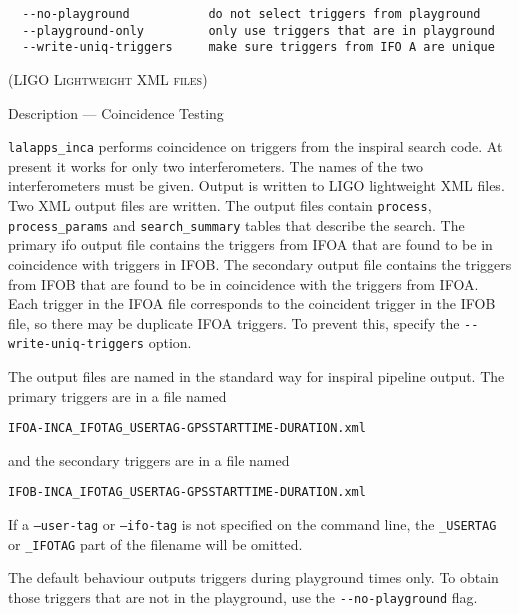 \begin{entry}
\begin{verbatim}
  --no-playground           do not select triggers from playground
  --playground-only         only use triggers that are in playground
  --write-uniq-triggers     make sure triggers from IFO A are unique

\end{verbatim}

\textsc{(LIGO Lightweight XML files)}

\item[Description --- Coincidence Testing] 

\verb$lalapps_inca$ performs coincidence on triggers from the inspiral search
code.  At present it works for only two interferometers.  The names of the two
interferometers must be given. Output is written to LIGO lightweight XML files.
Two XML output files are written.  The output files contain \texttt{process},
\texttt{process\_params} and \texttt{search\_summary} tables that describe the
search. The primary ifo output file contains the triggers from \textsc{IFOA}
that are found to be in coincidence with triggers in \textsc{IFOB}. The
secondary output file contains the triggers from \textsc{IFOB} that are found
to be in coincidence with the triggers from \textsc{IFOA}.  Each trigger in the
\textsc{IFOA} file corresponds to the coincident trigger in the \textsc{IFOB}
file, so there may be duplicate \textsc{IFOA} triggers.  To prevent this,
specify the \verb$--write-uniq-triggers$ option.

The output files are named in the standard way for inspiral pipeline output.
The primary triggers are in a file named\\
\begin{center}
\texttt{IFOA-INCA\_IFOTAG\_USERTAG-GPSSTARTTIME-DURATION.xml}\\
\end{center}
and the secondary triggers are in a file named\\
\begin{center}
\texttt{IFOB-INCA\_IFOTAG\_USERTAG-GPSSTARTTIME-DURATION.xml}\\
\end{center}

If a \texttt{--user-tag} or \texttt{--ifo-tag} is not specified on the command
line, the \texttt{\_USERTAG} or \texttt{\_IFOTAG} part of the filename will be
omitted.

The default behaviour outputs triggers during playground times only. To obtain
those triggers that are not in the playground, use the \verb$--no-playground$
flag.     


\end{entry}

